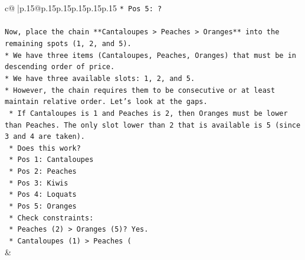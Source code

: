 \documentclass{article}
\begin{document}
{\begin{supertabular}{c@{$\;$}|p{.15\linewidth}@{}p{.15\linewidth}p{.15\linewidth}p{.15\linewidth}p{.15\linewidth}p{.15\linewidth}}
{{{\texttt{*   Pos 5: ?} \\
\\ 
\texttt{Now, place the chain **Cantaloupes > Peaches > Oranges** into the remaining spots (1, 2, and 5).} \\
\texttt{*   We have three items (Cantaloupes, Peaches, Oranges) that must be in descending order of price.} \\
\texttt{*   We have three available slots: 1, 2, and 5.} \\
\texttt{*   However, the chain requires them to be consecutive or at least maintain relative order. Let's look at the gaps.} \\
\texttt{    *   If Cantaloupes is 1 and Peaches is 2, then Oranges must be lower than Peaches. The only slot lower than 2 that is available is 5 (since 3 and 4 are taken).} \\
\texttt{    *   Does this work?} \\
\texttt{        *   Pos 1: Cantaloupes} \\
\texttt{        *   Pos 2: Peaches} \\
\texttt{        *   Pos 3: Kiwis} \\
\texttt{        *   Pos 4: Loquats} \\
\texttt{        *   Pos 5: Oranges} \\
\texttt{    *   Check constraints:} \\
\texttt{        *   Peaches (2) > Oranges (5)? Yes.} \\
\texttt{        *   Cantaloupes (1) > Peaches (} \\
            }
        }
    }
    & \\ \\


\end{supertabular}}
\end{document}

